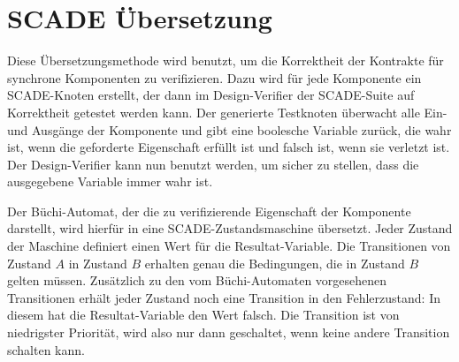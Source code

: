 \section{SCADE Übersetzung}
Diese Übersetzungsmethode wird benutzt, um die Korrektheit der Kontrakte für synchrone Komponenten zu verifizieren.
Dazu wird für jede Komponente ein SCADE-Knoten erstellt, der dann im Design-Verifier der SCADE-Suite auf Korrektheit getestet werden kann.
Der generierte Testknoten überwacht alle Ein- und Ausgänge der Komponente und gibt eine boolesche Variable zurück, die wahr ist, wenn die geforderte Eigenschaft erfüllt ist und falsch ist, wenn sie verletzt ist.
Der Design-Verifier kann nun benutzt werden, um sicher zu stellen, dass die ausgegebene Variable immer wahr ist.

Der Büchi-Automat, der die zu verifizierende Eigenschaft der Komponente darstellt, wird hierfür in eine SCADE-Zustandsmaschine übersetzt.
Jeder Zustand der Maschine definiert einen Wert für die Resultat-Variable.
Die Transitionen von Zustand $A$ in Zustand $B$ erhalten genau die Bedingungen, die in Zustand $B$ gelten müssen.
Zusätzlich zu den vom Büchi-Automaten vorgesehenen Transitionen erhält jeder Zustand noch eine Transition in den Fehlerzustand:
In diesem hat die Resultat-Variable den Wert falsch.
Die Transition ist von niedrigster Priorität, wird also nur dann geschaltet, wenn keine andere Transition schalten kann.